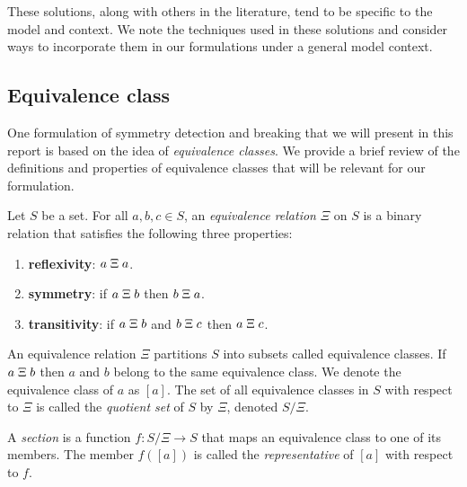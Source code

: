 These solutions, along with others in the literature, tend to be specific to the model and context. We note the techniques used in these solutions and consider ways to incorporate them in our formulations under a general model context.


\subsection{Equivalence class}

One formulation of symmetry detection and breaking that we will present in this report is based on the idea of \textit{equivalence classes}. We provide a brief review of the definitions and properties of equivalence classes that will be relevant for our formulation.

\begin{defn}
Let $S$ be a set. For all $a,b,c\in S$, an \textit{equivalence relation} $\Xi$ on $S$ is a binary relation that satisfies the following three properties:
\begin{enumerate}

\item
\textbf{reflexivity}: $a\;\Xi\; a$.

\item
\textbf{symmetry}: if $a\;\Xi\; b$ then $b\;\Xi\; a$.

\item
\textbf{transitivity}: if $a\;\Xi\; b$ and $b\;\Xi\; c$ then $a\;\Xi\; c$.

\end{enumerate}
An equivalence relation $\Xi$ partitions $S$ into subsets called equivalence classes. If $a\;\Xi\; b$ then $a$ and $b$ belong to the same equivalence class. We denote the equivalence class of $a$ as $[a]$. The set of all equivalence classes in $S$ with respect to $\Xi$ is called the \textit{quotient set} of $S$ by $\Xi$, denoted $S/\Xi$.
\end{defn}

\begin{defn}
A \textit{section} is a function $f:S/\Xi\rightarrow S$ that maps an equivalence class to one of its members. The member $f([a])$ is called the \textit{representative} of $[a]$ with respect to $f$.
\end{defn}

